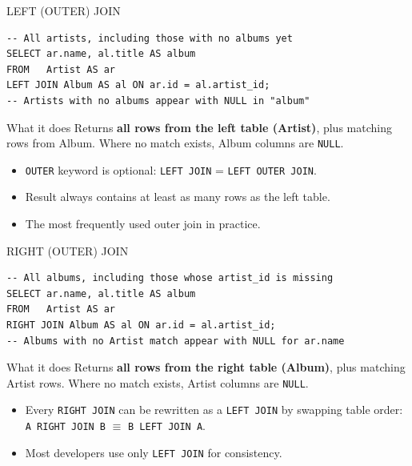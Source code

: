 \begin{frame}[fragile]{LEFT (OUTER) JOIN}
  \begin{center}\end{center}

  \begin{lstlisting}[style=sqlstyle]
-- All artists, including those with no albums yet
SELECT ar.name, al.title AS album
FROM   Artist AS ar
LEFT JOIN Album AS al ON ar.id = al.artist_id;
-- Artists with no albums appear with NULL in "album"
  \end{lstlisting}

  \begin{block}{What it does}
    Returns \textbf{all rows from the left table (Artist)}, plus matching rows from Album.
    Where no match exists, Album columns are \texttt{NULL}.
  \end{block}

  \begin{itemize}
    \item \texttt{OUTER} keyword is optional: \texttt{LEFT JOIN} = \texttt{LEFT OUTER JOIN}.
    \item Result always contains at least as many rows as the left table.
    \item The most frequently used outer join in practice.
  \end{itemize}
\end{frame}

\begin{frame}[fragile]{RIGHT (OUTER) JOIN}
  \begin{center}\end{center}

  \begin{lstlisting}[style=sqlstyle]
-- All albums, including those whose artist_id is missing
SELECT ar.name, al.title AS album
FROM   Artist AS ar
RIGHT JOIN Album AS al ON ar.id = al.artist_id;
-- Albums with no Artist match appear with NULL for ar.name
  \end{lstlisting}

  \begin{block}{What it does}
    Returns \textbf{all rows from the right table (Album)}, plus matching Artist rows.
    Where no match exists, Artist columns are \texttt{NULL}.
  \end{block}

  \begin{itemize}
    \item Every \texttt{RIGHT JOIN} can be rewritten as a \texttt{LEFT JOIN} by swapping table order:
          \texttt{A RIGHT JOIN B} $\equiv$ \texttt{B LEFT JOIN A}.
    \item Most developers use only \texttt{LEFT JOIN} for consistency.
  \end{itemize}
\end{frame}

